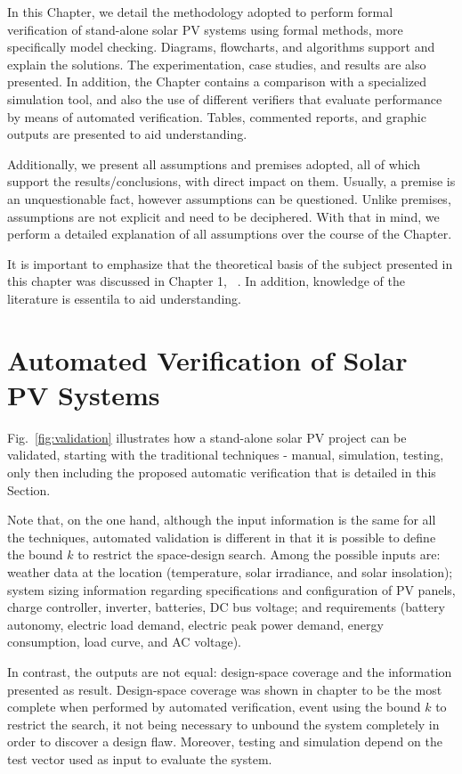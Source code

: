 In this Chapter, we detail the methodology adopted to perform formal verification of stand-alone solar PV systems using formal methods, more specifically model checking. Diagrams, flowcharts, and algorithms support and explain the solutions. The experimentation, case studies, and results are also presented. In addition, the Chapter contains a comparison with a specialized simulation tool, and also the use of different verifiers that evaluate performance by means of automated verification. Tables, commented reports, and graphic outputs are presented to aid  understanding.

Additionally, we present all assumptions and premises adopted, all of which support the results/conclusions, with direct impact on them. Usually, a premise is an unquestionable fact, however assumptions can be questioned. Unlike premises, assumptions are not explicit and need to be deciphered. With that in mind, we perform a detailed explanation of all assumptions over the course of the Chapter.

It is important to emphasize that the theoretical basis of the subject presented in this chapter was discussed in Chapter 1, ~. In addition, knowledge of the literature is essentila to aid understanding.


\section{Automated Verification of Solar PV Systems}

Fig.~\ref{fig:validation} illustrates how a stand-alone solar PV project can be validated, starting with the traditional techniques - manual, simulation, testing, only then including the proposed automatic verification that is detailed in this Section. 

Note that, on the one hand, although the input information is the same for all the techniques, automated validation is different in that it is possible to define the bound $k$ to restrict the space-design search. Among the possible inputs are: weather data at the location (temperature, solar irradiance, and solar insolation); system sizing information regarding specifications and configuration of PV panels, charge controller, inverter, batteries, DC bus  voltage; and requirements (battery autonomy, electric load demand, electric peak power demand, energy consumption, load curve, and AC voltage).

In contrast, the outputs are not equal: design-space coverage and the information presented as result. Design-space coverage was shown in chapter  to be the most complete when performed by automated verification, event using the bound $k$ to restrict the search, it not being necessary to unbound the system completely in order to discover a design flaw. Moreover, testing and simulation depend on the test vector used as input to evaluate the system.

